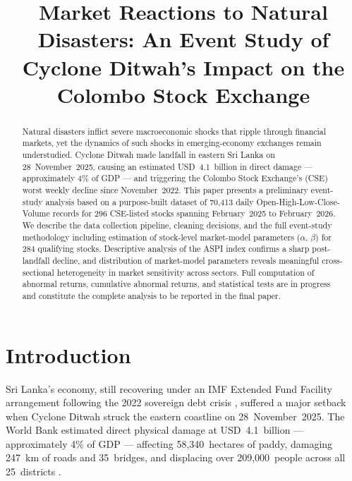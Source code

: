 \documentclass[sigconf, nonacm]{acmart}
\title{Market Reactions to Natural Disasters: An Event Study of\\
       Cyclone Ditwah's Impact on the Colombo Stock Exchange}
\begin{document}
\begin{abstract}
Natural disasters inflict severe macroeconomic shocks that ripple through financial markets, yet the dynamics of such shocks in emerging-economy exchanges remain understudied. Cyclone Ditwah made landfall in eastern Sri Lanka on 28~November~2025, causing an estimated USD~4.1~billion in direct damage --- approximately 4\% of GDP --- and triggering the Colombo Stock Exchange's (CSE) worst weekly decline since November~2022. This paper presents a preliminary event-study analysis based on a purpose-built dataset of 70,413 daily Open-High-Low-Close-Volume records for 296 CSE-listed stocks spanning February~2025 to February~2026. We describe the data collection pipeline, cleaning decisions, and the full event-study methodology including estimation of stock-level market-model parameters ($\alpha$, $\beta$) for 284 qualifying stocks. Descriptive analysis of the ASPI index confirms a sharp post-landfall decline, and distribution of market-model parameters reveals meaningful cross-sectional heterogeneity in market sensitivity across sectors. Full computation of abnormal returns, cumulative abnormal returns, and statistical tests are in progress and constitute the complete analysis to be reported in the final paper.
\end{abstract}


\maketitle

\section{Introduction}

Sri Lanka's economy, still recovering under an IMF Extended Fund Facility arrangement following the 2022 sovereign debt crisis \cite{imf2025}, suffered a major setback when Cyclone Ditwah struck the eastern coastline on 28~November~2025. The World Bank estimated direct physical damage at USD~4.1~billion --- approximately 4\% of GDP \cite{worldbank2025} --- affecting 58,340~hectares of paddy, damaging 247~km of roads and 35~bridges, and displacing over 209,000~people across all 25~districts \cite{who2025, ocha2025}.
\end{document}
